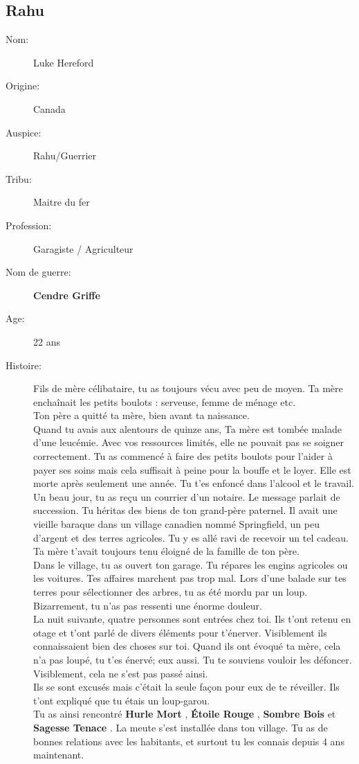 \documentclass[oneside,12pt]{book}
\newcommand{\Lynn}{\textbf{Étoile Rouge} }
\newcommand{\Jessica}{\textbf{Sagesse Tenace} }
\newcommand{\Luke}{\textbf{Cendre Griffe} }
\newcommand{\Peter}{\textbf{Hurle Mort} }
\newcommand{\Leonard}{\textbf{Sombre Bois} }
\begin{document}
\begin{flushleft}
\section{Rahu}
\begin{description}
\item[Nom:]{Luke Hereford}
\item[Origine:]{Canada}
\item[Auspice:]{Rahu/Guerrier}
\item[Tribu:]{Maitre du fer}
\item[Profession:]{Garagiste / Agriculteur}
\item[Nom de guerre:]{\Luke}
\item[Age:]{22 ans}
\item[Histoire:]{
Fils de mère célibataire, tu as toujours vécu avec peu de moyen. Ta mère enchaînait les petits boulots : 
serveuse, femme de ménage etc.\\
Ton père a quitté ta mère, bien avant ta naissance.\\
Quand tu avais aux alentours de quinze ans, Ta mère est tombée malade d'une leucémie. 
Avec vos ressources limités, elle ne pouvait pas se soigner correctement.
Tu as commencé à faire des petits boulots pour l'aider à payer ses soins mais cela suffisait à peine pour la bouffe
et le loyer. Elle est morte après seulement une année.
Tu t'es enfoncé dans l'alcool et le travail. 
Un beau jour, tu as reçu un courrier d'un notaire. Le message parlait de succession. Tu héritas des biens de ton grand-père paternel. 
Il avait une vieille baraque dans un village canadien nommé Springfield, un peu d'argent et des terres agricoles.
Tu y es allé ravi de recevoir un tel cadeau. Ta mère t'avait toujours tenu éloigné de la famille de ton père. \\
Dans le village, tu as ouvert ton garage. Tu répares les engins agricoles ou les voitures. 
Tes affaires marchent pas trop mal. Lors d'une balade sur tes terres pour sélectionner des arbres, 
tu as été mordu par un loup. 
Bizarrement, tu n'as pas ressenti une énorme douleur. \\
La nuit suivante, quatre personnes sont entrées chez toi. Ils t'ont retenu en otage et t'ont parlé de
divers éléments pour t'énerver. Visiblement ils connaissaient bien des choses sur toi.  
Quand ils ont évoqué ta mère, cela n'a pas loupé, tu t'es énervé; eux aussi. 
Tu te souviens vouloir les défoncer. Visiblement, cela ne s'est pas passé ainsi. \\
Ils se sont excusés mais c'était la seule façon pour eux de te réveiller. 
Ils t'ont expliqué que tu étais un loup-garou.\\
Tu as ainsi rencontré \Peter , \Lynn , \Leonard et \Jessica . 
La meute s'est installée dans ton village.
Tu as de bonnes relations avec les habitants, et surtout tu les connais depuis 4 ans maintenant.\\

}
\end{description}
\end{flushleft}
\end{document}
